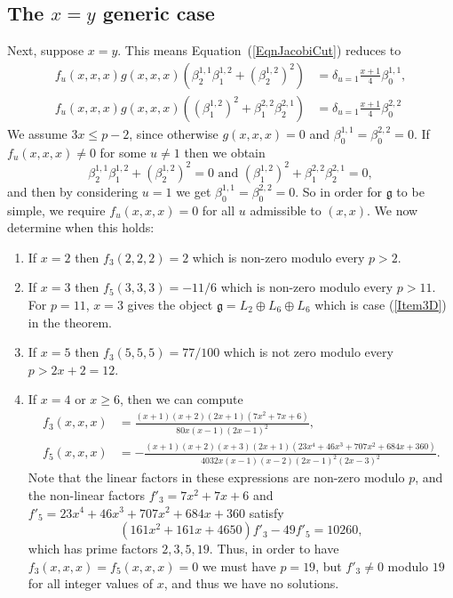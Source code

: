 \documentclass[11pt,a4paper,reqno]{amsart}
\theoremstyle{definition}
\numberwithin{equation}{section}
\newcommand{\fg}{\mathfrak{g}}
\begin{document}
\subsection{The $x=y$ generic case}\label{SecGeneric2} Next, suppose $x=y$. This means Equation~(\ref{EqnJacobiCut}) reduces to
\begin{align*}
f_u(x,x,x)g(x,x,x)\left(\beta^{1,1}_2\beta^{1,2}_1+(\beta^{1,2}_2)^2\right)&=\delta_{u=1}\frac{x+1}4\beta^{1,1}_0,\\
f_u(x,x,x)g(x,x,x)\left((\beta^{1,2}_1)^2+\beta^{2,2}_1\beta^{2,1}_2\right)&=\delta_{u=1}\frac{x+1}4\beta^{2,2}_0
\end{align*}
We assume $3x\leq p-2$, since otherwise $g(x,x,x)=0$ and $\beta^{1,1}_0=\beta^{2,2}_0=0$. If $f_u(x,x,x)\neq0$ for some $u\neq1$ then we obtain
\[\beta^{1,1}_2\beta^{1,2}_1+(\beta^{1,2}_2)^2=0\text{ and }(\beta^{1,2}_1)^2+\beta^{2,2}_1\beta^{2,1}_2=0,\]
and then by considering $u=1$ we get $\beta^{1,1}_0=\beta^{2,2}_0=0$. So in order for $\fg$ to be simple, we require $f_u(x,x,x)=0$ for all $u$ admissible to $(x,x)$. We now determine when this holds:
\begin{enumerate}
\item If $x=2$ then $f_3(2,2,2)=2$ which is non-zero modulo every $p>2$.
\item If $x=3$ then $f_5(3,3,3)=-11/6$ which is non-zero modulo every $p>11$. For $p=11$, $x=3$ gives the object $\fg=L_2\oplus L_6\oplus L_6$ which is case (\ref{Item3D}) in the theorem.
\item If $x=5$ then $f_3(5,5,5)=77/100$ which is not zero modulo every $p>2x+2=12$.
\item If $x=4$ or $x\geq6$, then we can compute
\begin{align*}
f_3(x,x,x)&=\frac{(x+1)(x+2)(2x+1)(7x^2+7x+6)}{80x(x-1)(2x-1)^2},\\
f_5(x,x,x)&=-\frac{(x+1)(x+2)(x+3)(2x+1)(23x^4+46x^3+707x^2+684x+360)}{4032x(x-1)(x-2)(2x-1)^2(2x-3)^2}.
\end{align*}
Note that the linear factors in these expressions are non-zero modulo $p$, and the non-linear factors $f'_3=7x^2+7x+6$ and $f'_5=23x^4+46x^3+707x^2+684x+360$ satisfy
\[(161x^2+161x+4650)f'_3-49f'_5=10260,\]
which has prime factors $2,3,5,19$. Thus, in order to have $f_3(x,x,x)=f_5(x,x,x)=0$ we must have $p=19$, but $f'_3\neq0$ modulo $19$ for all integer values of $x$, and thus we have no solutions.
\end{enumerate}
\end{document}
